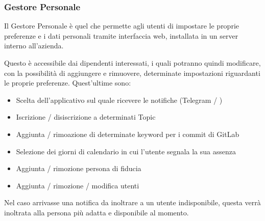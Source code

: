		
	
	\subsubsection{Gestore Personale}\label{TecnologieGestorePersonale}
	Il Gestore Personale è quel  che permette agli utenti di impostare le
	proprie preferenze e i dati personali tramite interfaccia web, installata in un server
	interno all'azienda.

	Questo è accessibile dai dipendenti interessati, i quali potranno quindi modificare, con
	la possibilità di aggiungere e rimuovere, determinate impostazioni riguardanti le proprie
	preferenze. Quest'ultime sono:
	\begin{itemize}
		\item Scelta dell'applicativo sul quale ricevere le notifiche (Telegram / \mail)
		\item Iscrizione / disiscrizione a determinati Topic
		\item Aggiunta / rimoazione di determinate keyword per i commit di GitLab
		\item Selezione dei giorni di calendario in cui l'utente segnala la sua assenza
		\item Aggiunta / rimozione persona di fiducia
		\item Aggiunta / rimozione / modifica utenti
	\end{itemize}
	Nel caso arrivasse una notifica da inoltrare a un utente indisponibile,
	questa verrà inoltrata alla persona più adatta e disponibile al momento.

